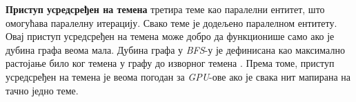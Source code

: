 \par
\textbf{Приступ усредсређен на темена} третира теме као паралелни ентитет, што омогућава паралелну итерацију. Свако теме је додељено паралелном ентитету. Овај приступ усредсређен на темена може добро да функционише само ако је дубина графа веома мала. Дубина графа у \textit{BFS}-у је дефинисана као максимално растојање било ког темена у графу до изворног темена \cite{graphs2}. Према томе, приступ усредсређен на темена је веома погодан за \textit{GPU}-ове ако је свака нит мапирана на тачно једно теме.